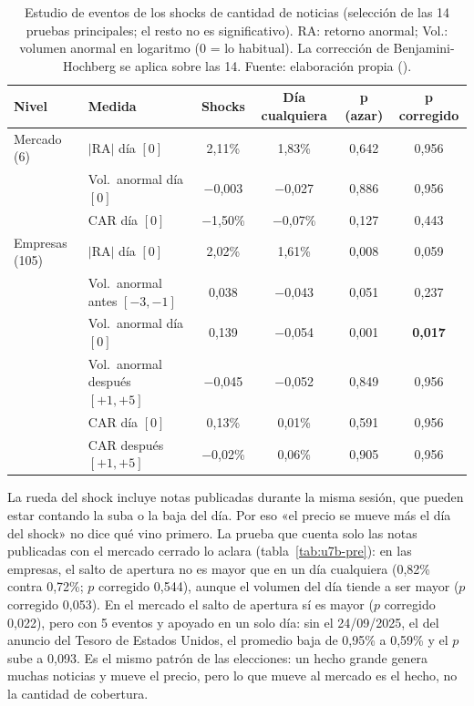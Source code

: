 \begin{table}[H]
\centering\footnotesize
\begin{tabular}{@{}llcccc@{}}
\toprule
\textbf{Nivel} & \textbf{Medida} & \textbf{Shocks} & \textbf{Día cualquiera} & \textbf{p (azar)} & \textbf{p corregido} \\
\midrule
Mercado (6) & $|$RA$|$ día $[0]$ & 2,11\% & 1,83\% & 0,642 & 0,956 \\
 & Vol.\ anormal día $[0]$ & $-$0,003 & $-$0,027 & 0,886 & 0,956 \\
 & CAR día $[0]$ & $-$1,50\% & $-$0,07\% & 0,127 & 0,443 \\
\midrule
Empresas (105) & $|$RA$|$ día $[0]$ & 2,02\% & 1,61\% & 0,008 & 0,059 \\
 & Vol.\ anormal antes $[-3,-1]$ & 0,038 & $-$0,043 & 0,051 & 0,237 \\
 & Vol.\ anormal día $[0]$ & 0,139 & $-$0,054 & 0,001 & \textbf{0,017} \\
 & Vol.\ anormal después $[+1,+5]$ & $-$0,045 & $-$0,052 & 0,849 & 0,956 \\
 & CAR día $[0]$ & 0,13\% & 0,01\% & 0,591 & 0,956 \\
 & CAR después $[+1,+5]$ & $-$0,02\% & 0,06\% & 0,905 & 0,956 \\
\bottomrule
\end{tabular}
\caption{Estudio de eventos de los shocks de cantidad de noticias (selección de las 14
pruebas principales; el resto no es significativo). RA: retorno anormal; Vol.: volumen
anormal en logaritmo (0 = lo habitual). La corrección de Benjamini-Hochberg se aplica sobre
las 14. Fuente: elaboración propia ().}
\label{tab:u7b}
\end{table}

La rueda del shock incluye notas publicadas durante la misma sesión, que pueden estar contando
la suba o la baja del día. Por eso «el precio se mueve más el día del shock» no dice qué vino
primero. La prueba que cuenta solo las notas publicadas con el mercado cerrado lo aclara
(tabla~\ref{tab:u7b-pre}): en las empresas, el salto de apertura no es mayor que en un día
cualquiera (0,82\% contra 0,72\%; $p$ corregido 0,544), aunque el volumen del día tiende a ser
mayor ($p$ corregido 0,053). En el mercado el salto de apertura sí es mayor ($p$ corregido
0,022), pero con 5 eventos y apoyado en un solo día: sin el 24/09/2025, el del anuncio del
Tesoro de Estados Unidos, el promedio baja de 0,95\% a 0,59\% y el $p$ sube a 0,093. Es el
mismo patrón de las elecciones: un hecho grande genera muchas noticias y mueve el precio, pero
lo que mueve al mercado es el hecho, no la cantidad de cobertura.

